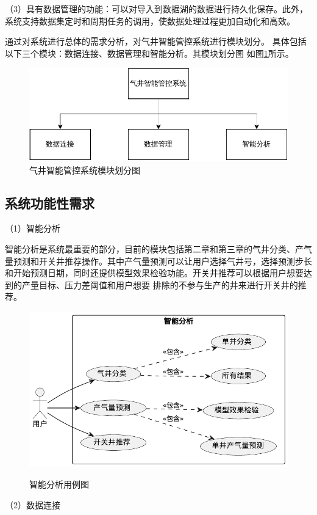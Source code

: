 （3）具有数据管理的功能：可以对导入到数据湖的数据进行持久化保存。此外，系统支持数据集定时和周期任务的调用，使数据处理过程更加自动化和高效。

通过对系统进行总体的需求分析，对气井智能管控系统进行模块划分。
具体包括以下三个模块：数据连接、数据管理和智能分析。其模块划分图
如图\ref{fig:allmodules}所示。
\begin{figure}[H]
    \centering
    \label{fig:allmodules}
    \caption{气井智能管控系统模块划分图}
    \includegraphics[width=.8\linewidth]{figure/systemincludemodles.pdf}
\end{figure}
\subsection{系统功能性需求}
（1）智能分析

智能分析是系统最重要的部分，目前的模块包括第二章和第三章的气井分类、产气量预测和开关井推荐操作。其中产气量预测可以让用户选择气井号，选择预测步长和开始预测日期，同时还提供模型效果检验功能。开关井推荐可以根据用户想要达到的产量目标、压力差阈值和用户想要
排除的不参与生产的井来进行开关井的推荐。
\begin{figure}[H]
    \centering
    \caption{智能分析用例图}
    \includegraphics[width=.7\linewidth]{figure/智能分析用例图.pdf}
    \label{fig:analyusecase}
\end{figure}

（2）数据连接

